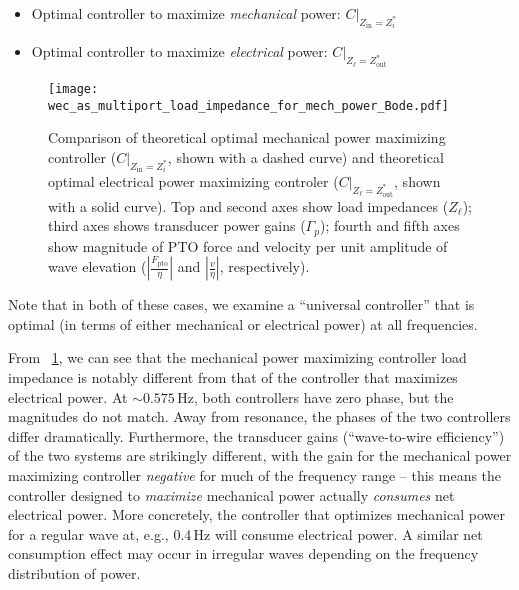 \documentclass[5p,times]{elsarticle}
\begin{document}
\begin{itemize}
        \item Optimal controller to maximize \emph{mechanical} power: $C \vert_{Z_{\textrm{in}} = Z_i^*}$
        \item Optimal controller to maximize \emph{electrical} power: $C \vert_{Z_\ell = Z_{\mathrm{out}}^*}$
\end{itemize}%
%
\begin{figure}[tb]
        \centering
        \texttt{[image: wec\_as\_multiport\_load\_impedance\_for\_mech\_power\_Bode.pdf]}
        \caption{Comparison of theoretical optimal mechanical power maximizing controller ($C \vert_{Z_{\textrm{in}} = Z_i^*}$, shown with a dashed curve) and theoretical optimal electrical power maximizing controler ($C \vert_{Z_\ell = Z_{\mathrm{out}}^*}$, shown with a solid curve). Top and second axes show load impedances ($Z_\ell$); third axes shows transducer power gains ($\Gamma_p$); fourth and fifth axes show magnitude of PTO force and velocity per unit amplitude of wave elevation ($\left| \frac{F_{\mathrm{pto}}}{\eta} \right|$ and $\left| \frac{v}{\eta} \right|$, respectively).}
        \label{fig:wec_as_multiport_load_impedance_for_mech_power}
\end{figure}
%
Note that in both of these cases, we examine a ``universal controller'' that is optimal (in terms of either mechanical or electrical power) at all frequencies.

From \figurename~\ref{fig:wec_as_multiport_load_impedance_for_mech_power}, we can see that the mechanical power maximizing controller load impedance is notably different from that of the controller that maximizes electrical power.
At $\sim 0.575$\,Hz, both controllers have zero phase, but the magnitudes do not match.
Away from resonance, the phases of the two controllers differ dramatically.
Furthermore, the transducer gains (``wave-to-wire efficiency'') of the two systems are strikingly different, with the gain for the mechanical power maximizing controller \emph{negative} for much of the frequency range -- this means the controller designed to \emph{maximize} mechanical power actually \emph{consumes} net electrical power.
More concretely, the controller that optimizes mechanical power for a regular wave at, e.g., 0.4\,Hz will consume electrical power.
A similar net consumption effect may occur in irregular waves depending on the frequency distribution of power.
\end{document}
